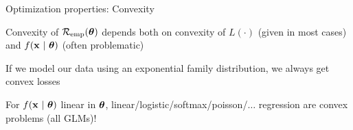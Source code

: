 \documentclass[11pt,compress,t,notes=noshow, xcolor=table]{beamer}
\begin{document}

\begin{frame}{Optimization properties: Convexity}

\begin{itemizeL}
\item Convexity of $\mathcal{R}_{\text{emp}}(\bm{\theta})$ depends both on convexity of $L(\cdot)$ (given in most cases) and $f(\mathbf{x} ~|~ \bm{\theta})$ (often problematic)
\item If we model our data using an exponential family distribution, we always get convex losses 
\item For $f(\mathbf{x} ~|~ \bm{\theta})$ linear in $\bm{\theta}$, linear/logistic/softmax/poisson/$\ldots$ regression are convex problems (all GLMs)! 
\end{itemizeL} 

\vfill

{
}%

\end{frame}

\end{document}
